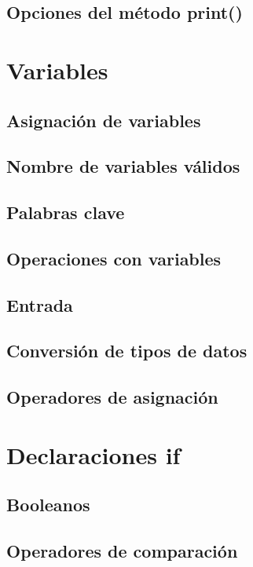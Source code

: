 \documentclass{article}
\begin{document}
\subsection{Opciones del método print()}

\section{Variables}

\subsection{Asignación de variables}

\subsection{Nombre de variables válidos}

\subsection{Palabras clave}

\subsection{Operaciones con variables}

\subsection{Entrada}

\subsection{Conversión de tipos de datos}

\subsection{Operadores de asignación}

\section{Declaraciones if}

\subsection{Booleanos}

\subsection{Operadores de comparación}
\end{document}
